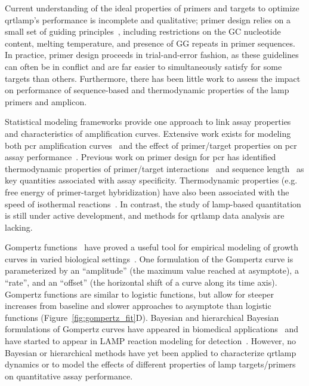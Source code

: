 \documentclass[../thesis.tex]{subfiles}
\begin{document}
Current understanding of the ideal properties of primers and targets to optimize \gls{qrtlamp}'s performance is incomplete and qualitative; primer design relies on a small set of guiding principles~\citep{panno_loop_2020}, including restrictions on the GC nucleotide content, melting temperature, and presence of GG repeats in primer sequences. In practice, primer design proceeds in trial-and-error fashion, as these guidelines can often be in conflict and are far easier to simultaneously satisfy for some  targets than others. Furthermore, there has been little work to assess the impact on performance of sequence-based and thermodynamic properties of the \gls{lamp} primers and amplicon.

Statistical modeling frameworks provide one approach to link assay properties and characteristics of amplification curves. Extensive work exists for modeling both \gls{pcr} amplification curves~\citep{spiess_highly_2008, matz_no_2013, subramanian_empirical_2014,  nguyen_quantification_2020} and the effect of primer/target properties on \gls{pcr} assay performance~\citep{mallona_pcrefficiency_2011, wright_exploiting_2014, doring_modeling_2019}. Previous work on primer design for \gls{pcr} has identified thermodynamic properties of primer/target interactions~\citep{mann_thermodynamic_2009, li_primer_2010, doring_modeling_2019} and sequence length~\citep{huang_developing_2022} as key quantities associated with assay specificity. Thermodynamic properties (e.g. free energy of primer-target hybridization) have also been associated with the speed of isothermal reactions~\citep{kimura_optimization_2011}.
In contrast, the study of \gls{lamp}-based quantitation is still under active development, and methods for \gls{qrtlamp} data analysis are lacking. 

Gompertz functions~\citep{gompertz_xxiv_1825} have proved a useful tool for empirical modeling of growth curves in varied biological settings~\citep{tjorve_use_2017}.  One formulation of the Gompertz curve is parameterized by an ``amplitude'' (the maximum value reached at asymptote), a ``rate'', and an ``offset'' (the horizontal shift of a curve along its time axis). Gompertz functions are similar to logistic functions, but allow for steeper increases from baseline and slower approaches to asymptote than logistic functions (Figure~\ref{fig:gompertz_fit}D). Bayesian and hierarchical Bayesian formulations of Gompertz curves have appeared in biomedical applications~\citep{wiper_bayesian_2010,  demirhan_bayesian_2015, sasaki_informative_2016,gotuzzo_bayesian_2019, vaghi_population_2020, berihuete_bayesian_2021} and have started to appear in LAMP reaction modeling for detection~\citep{carvalho_faster_2021}. However, no Bayesian or hierarchical methods have yet been applied to characterize \gls{qrtlamp} dynamics or to model the effects of different properties of \gls{lamp} targets/primers on quantitative assay performance.
\end{document}
